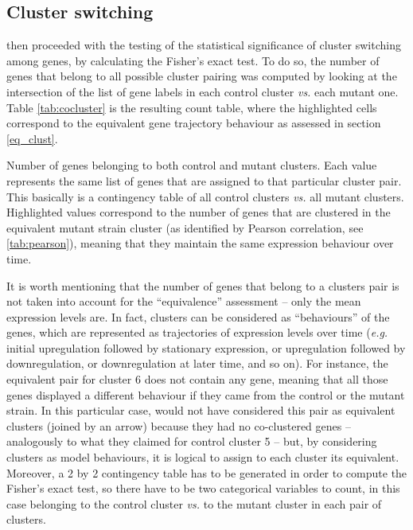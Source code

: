 \subsection{Cluster switching}
\citeauthor{mcdowellClusteringGeneExpression2018} then proceeded with the testing of the statistical significance of cluster switching among genes, by calculating the Fisher's exact test. To do so, the number of genes that belong to all possible cluster pairing was computed by looking at the intersection of the list of gene labels in each control cluster \textit{vs.} each mutant one. Table \ref{tab:cocluster} is the resulting count table, where the highlighted cells correspond to the equivalent gene trajectory behaviour as assessed in section \ref{eq_clust}.

\begin{table}[!ht]
    \centering\footnotesize
    
    \caption[Co-clustered genes in each pairwise combination]{Number of genes belonging to both control and mutant clusters. Each value represents the same list of genes that are assigned to that particular cluster pair. This basically is a contingency table of all control clusters \textit{vs.} all mutant clusters. Highlighted values correspond to the number of genes that are clustered in the equivalent mutant strain cluster (as identified by Pearson correlation, see \ref{tab:pearson}), meaning that they maintain the same expression behaviour over time.}\label{tab:cocluster}
\end{table}

It is worth mentioning that the number of genes that belong to a clusters pair is not taken into account for the ``equivalence'' assessment -- only the mean expression levels are. In fact, clusters can be considered as ``behaviours'' of the genes, which are represented as trajectories of expression levels over time (\textit{e.g.} initial upregulation followed by stationary expression, or upregulation followed by downregulation, or downregulation at later time, and so on).
For instance, the equivalent pair for cluster 6 does not contain any gene, meaning that all those genes displayed a different behaviour if they came from the control or the mutant strain. In this particular case, \citeauthor{mcdowellClusteringGeneExpression2018} would not have considered this pair as equivalent clusters (joined by an arrow) because they had no co-clustered genes -- analogously to what they claimed for control cluster 5 -- but, by considering clusters as model behaviours, it is logical to assign to each cluster its equivalent. Moreover, a 2 by 2 contingency table has to be generated in order to compute the Fisher's exact test, so there have to be two categorical variables to count, in this case belonging to the control cluster \textit{vs.} to the mutant cluster in each pair of clusters.  

